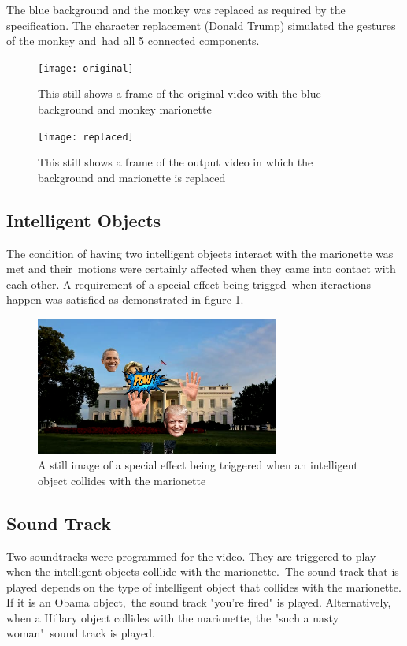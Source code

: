 \documentclass[12pt,a4paper]{article}
\begin{document}
      The blue background and the monkey was replaced as required by the specification. The character replacement (Donald Trump) simulated the gestures of the monkey and\
      had all 5 connected components.

      \begin{figure}[H]
        \texttt{[image: original]}
        \caption{This still shows a frame of the original video with the blue background and monkey marionette}
      \end{figure}
      \begin{figure}[H]
        \texttt{[image: replaced]}
        \caption{This still shows a frame of the output video in which the background and marionette is replaced}
      \end{figure}


      \subsection{Intelligent Objects}

      The condition of having two intelligent objects interact with the marionette was met and their\
      motions were certainly affected when they came into contact with each other. A requirement of a special effect being trigged\
      when iteractions happen was satisfied as demonstrated in figure 1.

      \begin{figure}[H]
        \includegraphics[width=8cm]{pow}
        \caption{A still image of a special effect being triggered when an intelligent object collides with the marionette}
      \end{figure}

      \subsection{Sound Track}

      Two soundtracks were programmed for the video. They are triggered to play when the intelligent objects colllide with the marionette.\
      The sound track that is played depends on the type of intelligent object that collides with the marionette. If it is an Obama object,\
      the sound track "you're fired" is played. Alternatively, when a Hillary object collides with the marionette, the "such a nasty woman"\
      sound track is played.
\end{document}

